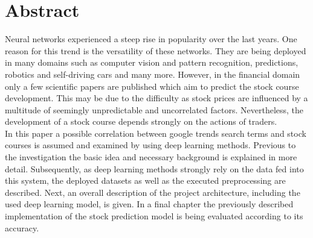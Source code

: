 \section{Abstract}
\label{sec:abstract}
Neural networks experienced a steep rise in popularity over the last years. One reason for this trend is the versatility of these networks. They are being deployed in many domains such as computer vision and pattern recognition, predictions, robotics and self-driving cars and many more. However, in the financial domain only a few scientific papers are published which aim to predict the stock course development. This may be due to the difficulty as stock prices are influenced by a multitude of seemingly unpredictable and uncorrelated factors. Nevertheless, the development of a stock course depends strongly on the actions of traders. 
\\
In this paper a possible correlation between google trends search terms and stock courses is assumed and examined by using deep learning methods. Previous to the investigation the basic idea and necessary background is explained in more detail. Subsequently, as deep learning methods strongly rely on the data fed into this system, the deployed datasets as well as the executed preprocessing are described. Next, an overall description of the project architecture, including the used deep learning model, is given. In a final chapter the previously described implementation of the stock prediction model is being evaluated according to its accuracy. 